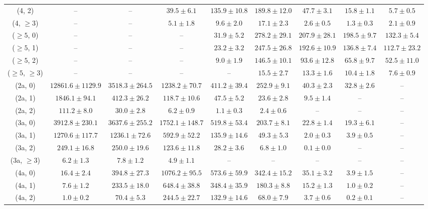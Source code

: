 \begin{table}[h!]
{\begin{tabular}{ccccccccc}
	(4, 2) & -- & -- & $39.5\pm 6.1$ & $135.9\pm 10.8$ & $189.8\pm 12.0$ & $47.7\pm 3.1$ & $15.8\pm 1.1$ & $5.7\pm 0.5$ \\[0.5ex] 
	(4, $\ge3$) & -- & -- & $5.1\pm 1.8$ & $9.6\pm 2.0$ & $17.1\pm 2.3$ & $2.6\pm 0.5$ & $1.3\pm 0.3$ & $2.1\pm 0.9$ \\[0.5ex] 
	($\ge5$, 0) & -- & -- & -- & $31.9\pm 5.2$ & $278.2\pm 29.1$ & $207.9\pm 28.1$ & $198.5\pm 9.7$ & $132.3\pm 5.4$ \\[0.5ex] 
	($\ge5$, 1) & -- & -- & -- & $23.2\pm 3.2$ & $247.5\pm 26.8$ & $192.6\pm 10.9$ & $136.8\pm 7.4$ & $112.7\pm 23.2$ \\[0.5ex] 
	($\ge5$, 2) & -- & -- & -- & $9.0\pm 1.9$ & $146.5\pm 10.1$ & $93.6\pm 12.8$ & $65.8\pm 9.7$ & $52.5\pm 11.0$ \\[0.5ex] 
	($\ge5$, $\ge3$) & -- & -- & -- & -- & $15.5\pm 2.7$ & $13.3\pm 1.6$ & $10.4\pm 1.8$ & $7.6\pm 0.9$ \\[0.5ex] 
	(2a, 0) & $12861.6\pm 1129.9$ & $3518.3\pm 264.5$ & $1238.2\pm 70.7$ & $411.2\pm 39.4$ & $252.9\pm 9.1$ & $40.3\pm 2.3$ & $32.8\pm 2.6$ & -- \\[0.5ex] 
	(2a, 1) & $1846.1\pm 94.1$ & $412.3\pm 26.2$ & $118.7\pm 10.6$ & $47.5\pm 5.2$ & $23.6\pm 2.8$ & $9.5\pm 1.4$ & -- & -- \\[0.5ex] 
	(2a, 2) & $111.2\pm 8.0$ & $30.0\pm 2.8$ & $6.2\pm 0.9$ & $1.1\pm 0.3$ & $2.4\pm 0.6$ & -- & -- & -- \\[0.5ex] 
	(3a, 0) & $3912.8\pm 230.1$ & $3637.6\pm 255.2$ & $1752.1\pm 148.7$ & $519.8\pm 53.4$ & $203.7\pm 8.1$ & $22.8\pm 1.4$ & $19.3\pm 6.1$ & -- \\[0.5ex] 
	(3a, 1) & $1270.6\pm 117.7$ & $1236.1\pm 72.6$ & $592.9\pm 52.2$ & $135.9\pm 14.6$ & $49.3\pm 5.3$ & $2.0\pm 0.3$ & $3.9\pm 0.5$ & -- \\[0.5ex] 
	(3a, 2) & $249.1\pm 16.8$ & $250.0\pm 19.6$ & $123.6\pm 11.8$ & $28.2\pm 3.6$ & $6.8\pm 1.0$ & $0.1\pm 0.0$ & -- & -- \\[0.5ex] 
	(3a, $\ge3$) & $6.2\pm 1.3$ & $7.8\pm 1.2$ & $4.9\pm 1.1$ & -- & -- & -- & -- & -- \\[0.5ex] 
	(4a, 0) & $16.4\pm 2.4$ & $394.8\pm 27.3$ & $1076.2\pm 95.5$ & $573.6\pm 59.9$ & $342.4\pm 15.2$ & $35.1\pm 3.2$ & $3.9\pm 1.5$ & -- \\[0.5ex] 
	(4a, 1) & $7.6\pm 1.2$ & $233.5\pm 18.0$ & $648.4\pm 38.8$ & $348.4\pm 35.9$ & $180.3\pm 8.8$ & $15.2\pm 1.3$ & $1.0\pm 0.2$ & -- \\[0.5ex] 
	(4a, 2) & $1.0\pm 0.2$ & $70.4\pm 5.3$ & $244.5\pm 22.7$ & $132.9\pm 14.6$ & $68.0\pm 7.9$ & $3.7\pm 0.6$ & $0.2\pm 0.1$ & -- \\[0.5ex] 

\end{tabular}}
\end{table}
